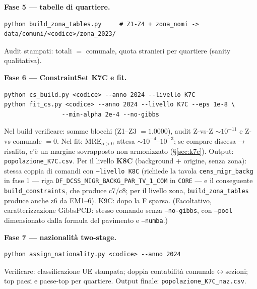 \documentclass[11pt,a4paper]{article}
\newcommand{\code}[1]{\texttt{#1}}
\begin{document}
\medskip\noindent\textbf{Fase 5 --- tabelle di quartiere.}
\begin{lstlisting}
python build_zona_tables.py     # Z1-Z4 + zona_nomi -> data/comuni/<codice>/zona_2023/
\end{lstlisting}
Audit stampati: totali $=$ comunale, quota stranieri per quartiere (sanity
qualitativa).

\medskip\noindent\textbf{Fase 6 --- ConstraintSet K7C e fit.}
\begin{lstlisting}
python cs_build.py <codice> --anno 2024 --livello K7C
python fit_cs.py <codice> --anno 2024 --livello K7C --eps 1e-8 \
                --min-alpha 2e-4 --no-gibbs
\end{lstlisting}
Nel build verificare: somme blocchi (Z1--Z3 $=1.0000$), audit Z-vs-Z
$\sim10^{-11}$ e Z-vs-comunale $=0$. Nel fit: MRE$_{\alpha>0}$ attesa
$\sim10^{-4}$--$10^{-3}$; se compare discesa$\to$risalita, c'\`e un margine
sovrapposto non armonizzato (\S\ref{sec:k7c}). Output:
\code{popolazione\_K7C.csv}. Per il livello \textbf{K8C} (background $+$
origine, senza zona): stessa coppia di comandi con \code{--livello K8C}
(richiede la tavola \code{cens\_migr\_backg} in fase 1 --- riga
\code{DF\_DCSS\_MIGR\_BACKG\_PAR\_TV\_1\_COM} in \code{CORE} --- e il
conseguente \code{build\_constraints}, che produce c7/c8; per il livello
zona, \code{build\_zona\_tables} produce anche z6 da EM1--6). K9C: dopo la
F sparsa.
(Facoltativo, caratterizzazione GibbsPCD: stesso comando senza
\code{--no-gibbs}, con \code{--pool} dimensionato dalla formula del
pavimento e \code{--numba}.)

\medskip\noindent\textbf{Fase 7 --- nazionalit\`a two-stage.}
\begin{lstlisting}
python assign_nationality.py <codice> --anno 2024
\end{lstlisting}
Verificare: classificazione UE stampata; doppia contabilit\`a
comunale$\leftrightarrow$sezioni; top paesi e paese-top per quartiere.
Output finale: \code{popolazione\_K7C\_naz.csv}.
\end{document}
